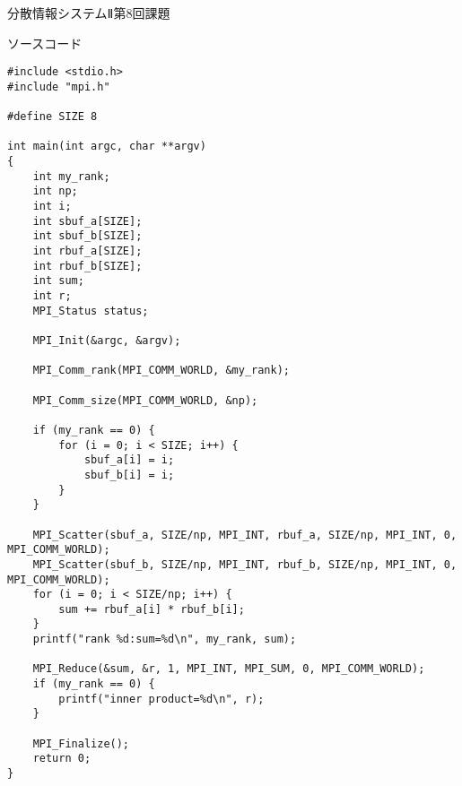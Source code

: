 \documentclass[a4paper, titlepage]{jsarticle}
\begin{document}
	分散情報システムⅡ第8回課題

	ソースコード
	\begin{lstlisting}
#include <stdio.h>
#include "mpi.h"

#define SIZE 8

int main(int argc, char **argv)
{
	int my_rank;
	int np;
	int i;
	int sbuf_a[SIZE];
	int sbuf_b[SIZE];
	int rbuf_a[SIZE];
	int rbuf_b[SIZE];
	int sum;
	int r;
	MPI_Status status;

	MPI_Init(&argc, &argv);

	MPI_Comm_rank(MPI_COMM_WORLD, &my_rank);

	MPI_Comm_size(MPI_COMM_WORLD, &np);

	if (my_rank == 0) {
		for (i = 0; i < SIZE; i++) {
			sbuf_a[i] = i;
			sbuf_b[i] = i;
		}
	}

	MPI_Scatter(sbuf_a, SIZE/np, MPI_INT, rbuf_a, SIZE/np, MPI_INT, 0, MPI_COMM_WORLD);
	MPI_Scatter(sbuf_b, SIZE/np, MPI_INT, rbuf_b, SIZE/np, MPI_INT, 0, MPI_COMM_WORLD);
	for (i = 0; i < SIZE/np; i++) {
		sum += rbuf_a[i] * rbuf_b[i];
	}
	printf("rank %d:sum=%d\n", my_rank, sum);

	MPI_Reduce(&sum, &r, 1, MPI_INT, MPI_SUM, 0, MPI_COMM_WORLD);
	if (my_rank == 0) {
		printf("inner product=%d\n", r);
	}

	MPI_Finalize();
	return 0;
}
	\end{lstlisting}
\end{document}

